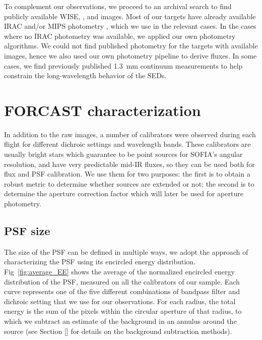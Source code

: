 To complement our observations, we proceed to an archival search to find publicly available WISE, \Spitzer, and \Herschel images. Most of our targets have already available \Spitzer IRAC and/or MIPS photometry \citep[mostly from][]{Gutermuth:2009gca,Megeath:2012cn,Evans:2009bka}, which we use in the relevant cases. In the cases where no IRAC photometry was available, we applied our own photometry algorithms. We could not find published photometry for the targets with available \Herschel images, hence we also used our own photometry pipeline to derive fluxes. In some cases, we find previously published \SI{1.3}{\milli\meter} continuum measurements to help constrain the long-wavelength behavior of the SEDs.


\section{FORCAST characterization}

In addition to the raw images, a number of calibrators were observed during each flight for different dichroic settings and wavelength bands. These calibrators are usually bright stars which guarantee to be point sources for SOFIA's angular resolution, and have very predictable mid-IR fluxes, so they can be used both for flux and PSF calibration. We use them for two purposes: the first is to obtain a robust metric to determine whether sources are extended or not; the second is to determine the aperture correction factor which will later be used for aperture photometry. 

\subsection{PSF size}
The size of the PSF can be defined in multiple ways, we adopt the approach of characterizing the PSF using its encircled energy distribution. Fig~\ref{fig:average_EE} shows the average of the normalized encircled energy distribution of the PSF, measured on all the calibrators of our sample. Each curve represents one of the five different combinations of bandpass filter and dichroic setting that we use for our observations. For each radius, the total energy is the sum of the pixels within the circular aperture of that radius, to which we subtract an estimate of the background in an annulus around the source (see Section [] for details on the background subtraction methods). 

